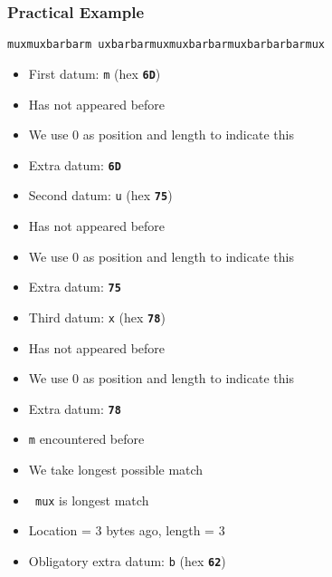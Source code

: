 \documentclass{../ucll-slides}
\newcommand{\hex}[1]{\texttt{\bfseries #1}}
\begin{document}
\begin{frame}
  \frametitle{Practical Example}
  \begin{center}
    \tt \alert<1-2>{m}\alert<3-4>{u}\alert<5-6>{x}{mux}\alert<7-8>{b}\alert<9-10>{a}\alert<11-12>{r}{\only<13-14>{\color{green}}bar}\alert<13-14>{m}%
    {uxbarbarm}\alert<15-16>{u}{xmuxbarbarmuxbarbar}\alert<17-18>{b}{armu}\alert<19-20>{x}
  \end{center}
  \begin{overprint}
    \begin{itemize}
      \item First datum: {\tt m} (hex \hex{6D})
      \item Has not appeared before
      \item We use 0 as position and length to indicate this
      \item Extra datum: \hex{6D}
    \end{itemize}

    \begin{itemize}
      \item Second datum: {\tt u} (hex \hex{75})
      \item Has not appeared before
      \item We use 0 as position and length to indicate this
      \item Extra datum: \hex{75}
    \end{itemize}

    \begin{itemize}
      \item Third datum: {\tt x} (hex \hex{78})
      \item Has not appeared before
      \item We use 0 as position and length to indicate this
      \item Extra datum: \hex{78}
    \end{itemize}

    \begin{itemize}
      \item {\tt m} encountered before
      \item We take longest possible match
      \item {\tt\color{green} mux} is longest match
      \item Location = 3 bytes ago, length = 3
      \item Obligatory extra datum: {\tt b} (hex \hex{62})
    \end{itemize}


\end{overprint}
\end{frame}
\end{document}

